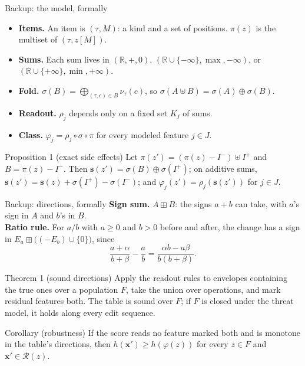 \documentclass[aspectratio=169,11pt]{beamer}
\begin{document}
\begin{frame}{Backup: the model, formally}
  \small
  \begin{itemize}
    \setlength{\itemsep}{0.5em}
    \item \textbf{Items.} An item is $(\tau, M)$: a kind and a set of positions. $\pi(z)$ is the multiset of
      $(\tau, z[M])$.
    \item \textbf{Sums.} Each sum lives in $(\mathbb{R}, +, 0)$, $(\mathbb{R} \cup \{-\infty\}, \max, -\infty)$, or
      $(\mathbb{R} \cup \{+\infty\}, \min, +\infty)$.
    \item \textbf{Fold.} $\sigma(B) = \bigoplus_{(\tau, c) \in B} \nu_\tau(c)$, so
      $\sigma(A \uplus B) = \sigma(A) \oplus \sigma(B)$.
    \item \textbf{Readout.} $\rho_j$ depends only on a fixed set $K_j$ of sums.
    \item \textbf{Class.} $\varphi_j = \rho_j \circ \sigma \circ \pi$ for every modeled feature $j \in J$.
  \end{itemize}
  \vfill
  \begin{block}{Proposition 1 (exact side effects)}
    Let $\pi(z') = (\pi(z) - I^-) \uplus I^+$ and $B = \pi(z) - I^-$. Then
    $\mathbf{s}(z') = \sigma(B) \oplus \sigma(I^+)$; on additive sums,
    $\mathbf{s}(z') = \mathbf{s}(z) + \sigma(I^+) - \sigma(I^-)$; and $\varphi_j(z') = \rho_j(\mathbf{s}(z'))$ for
    $j \in J$.
  \end{block}
\end{frame}

\begin{frame}{Backup: directions, formally}
  \small
  \textbf{Sign sum.} $A \boxplus B$: the signs $a + b$ can take, with $a$'s sign in $A$ and $b$'s in $B$.\\[0.6em]
  \textbf{Ratio rule.} For $a / b$ with $a \ge 0$ and $b > 0$ before and after, the change has a sign in
  $E_a \boxplus \big((-E_b) \cup \{0\}\big)$, since
  \[
    \frac{a + \alpha}{b + \beta} - \frac{a}{b} = \frac{\alpha b - a \beta}{b (b + \beta)}.
  \]
  \vfill
  \begin{block}{Theorem 1 (sound directions)}
    Apply the readout rules to envelopes containing the true ones over a population $F$, take the union over
    operations, and mark residual features both. The table is sound over $F$; if $F$ is closed under the threat
    model, it holds along every edit sequence.
  \end{block}
  \vfill
  \begin{block}{Corollary (robustness)}
    If the score reads no feature marked both and is monotone in the table's directions, then
    $h(\mathbf{x}') \ge h(\varphi(z))$ for every $z \in F$ and $\mathbf{x}' \in \mathcal{R}(z)$.
  \end{block}
\end{frame}
\end{document}
